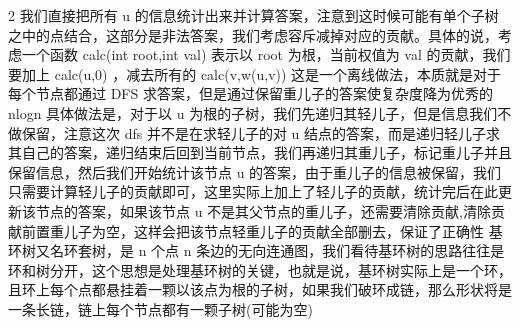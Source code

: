 {}\markdownRendererDollarSign{} 2 \markdownRendererDollarSign{}我们直接把所有\markdownRendererDollarSign{} u \markdownRendererDollarSign{}的信息统计出来并计算答案，注意到这时候可能有单个子树之中的点结合，这部分是非法答案，我们考虑容斥减掉对应的贡献。具体的说，考虑一个函数\markdownRendererDollarSign{} calc(int\markdownRendererBackslash{} root,int\markdownRendererBackslash{} val) \markdownRendererDollarSign{}表示以\markdownRendererDollarSign{} root \markdownRendererDollarSign{}为根，当前权值为\markdownRendererDollarSign{} val \markdownRendererDollarSign{}的贡献，我们要加上\markdownRendererDollarSign{} calc(u,0) \markdownRendererDollarSign{}，减去所有的\markdownRendererDollarSign{} calc(v,w(u,v)) \markdownRendererDollarSign{}\markdownRendererInterblockSeparator
{}\markdownRendererInterblockSeparator
{}
\markdownRendererSectionEnd \markdownRendererSectionBegin
{}\markdownRendererInterblockSeparator
{}这是一个离线做法，本质就是对于每个节点都通过\markdownRendererDollarSign{} DFS \markdownRendererDollarSign{}求答案，但是通过保留重儿子的答案使复杂度降为优秀的\markdownRendererDollarSign{} nlogn \markdownRendererDollarSign{}\markdownRendererParagraphSeparator
{}具体做法是，对于以\markdownRendererDollarSign{} u \markdownRendererDollarSign{}为根的子树，我们先递归其轻儿子，但是信息我们不做保留，注意这次\markdownRendererDollarSign{} dfs \markdownRendererDollarSign{}并不是在求轻儿子的对\markdownRendererDollarSign{} u \markdownRendererDollarSign{}结点的答案，而是递归轻儿子求其自己的答案，递归结束后回到当前节点，我们再递归其重儿子，标记重儿子并且保留信息，然后我们开始统计该节点\markdownRendererDollarSign{} u \markdownRendererDollarSign{}的答案，由于重儿子的信息被保留，我们只需要计算轻儿子的贡献即可，这里实际上加上了轻儿子的贡献，统计完后在此更新该节点的答案，如果该节点\markdownRendererDollarSign{} u \markdownRendererDollarSign{}不是其父节点的重儿子，还需要清除贡献,清除贡献前置重儿子为空，这样会把该节点轻重儿子的贡献全部删去，保证了正确性\markdownRendererInterblockSeparator
{}\markdownRendererInterblockSeparator
{}
\markdownRendererSectionEnd \markdownRendererSectionBegin
{}\markdownRendererInterblockSeparator
{}基环树又名环套树，是\markdownRendererDollarSign{} n \markdownRendererDollarSign{}个点\markdownRendererDollarSign{} n \markdownRendererDollarSign{}条边的无向连通图，我们看待基环树的思路往往是环和树分开，这个思想是处理基环树的关键，也就是说，基环树实际上是一个环，且环上每个点都悬挂着一颗以该点为根的子树，如果我们破环成链，那么形状将是一条长链，链上每个节点都有一颗子树(可能为空)\markdownRendererParagraphSeparator
